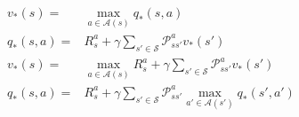\begin{align}
v_{*}(s) = {} & \max_{a \in \mathcal{A}(s)} q_{*}(s,a) \label{eq:optimal_state_action}\\
q_{*}(s,a) = {} & \mathit{R}_{s}^{a} + \gamma \sum_{s' \in \mathcal{S}}^{} \mathcal{P}_{ss'}^{a} v_{*}(s') \label{eq:optimal_action_state} \\
v_{*}(s) = {} & \max_{a \in \mathcal{A}(s)} \mathit{R}_{s}^{a} + \gamma \sum_{s' \in \mathcal{S}}^{} \mathcal{P}_{ss'}^{a} v_{*}(s') \label{eq:bellman_optimal_state}\\
q_{*}(s,a) = {} & \mathit{R}_{s}^{a} + \gamma \sum_{s' \in \mathcal{S}}^{} \mathcal{P}_{ss'}^{a} \max_{a' \in \mathcal{A}(s')} q_{*}(s',a') \label{eq:bellman_optimal_action}		
\end{align}

